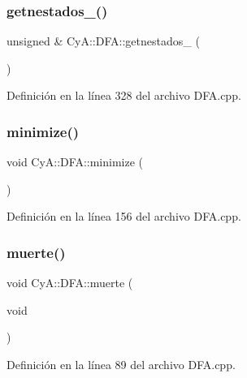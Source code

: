 \subsubsection{\texorpdfstring{getnestados\+\_\+()}{getnestados\_()}}
{\footnotesize\ttfamily unsigned \& Cy\+A\+::\+D\+F\+A\+::getnestados\+\_\+ (\begin{DoxyParamCaption}{ }\end{DoxyParamCaption})}



Definición en la línea 328 del archivo D\+F\+A.\+cpp.

\mbox{\label{class_cy_a_1_1_d_f_a_a91c3735ac2f148c78457971a63d0a1cb}} 
\subsubsection{\texorpdfstring{minimize()}{minimize()}}
{\footnotesize\ttfamily void Cy\+A\+::\+D\+F\+A\+::minimize (\begin{DoxyParamCaption}{ }\end{DoxyParamCaption})}



Definición en la línea 156 del archivo D\+F\+A.\+cpp.

\mbox{\label{class_cy_a_1_1_d_f_a_a5b5a105e8559377533cabfdff703d0a5}} 
\subsubsection{\texorpdfstring{muerte()}{muerte()}}
{\footnotesize\ttfamily void Cy\+A\+::\+D\+F\+A\+::muerte (\begin{DoxyParamCaption}\item[{void}]{ }\end{DoxyParamCaption})}



Definición en la línea 89 del archivo D\+F\+A.\+cpp.

\mbox{\label{class_cy_a_1_1_d_f_a_ad6a919f15da7b1c173ef8f40153749fc}} 
